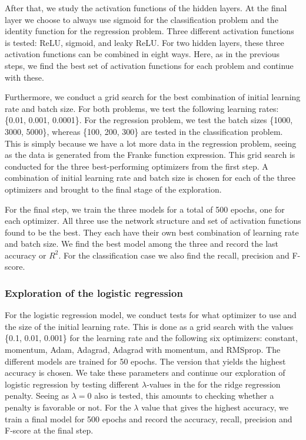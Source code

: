 After that, we study the activation functions of the hidden layers. At the final layer we choose to always use sigmoid for the classification problem and the identity function for the regression problem. 
Three different activation functions is tested: ReLU, sigmoid, and leaky ReLU. For two hidden layers, these three activation functions can be combined in eight ways. Here, as in the previous steps, we find the best set of activation functions for each problem and continue with these. 

Furthermore, we conduct a grid search for the best combination of initial learning rate and batch size. For both problems, we test the following learning rates: \{0.01, 0.001, 0.0001\}. 
For the regression problem, we test the batch sizes \{1000, 3000, 5000\}, whereas \{100, 200, 300\} are tested in the classification problem. 
This is simply because we have a lot more data in the regression problem, seeing as the data is generated from the Franke function expression. This grid search is conducted for the three best-performing optimizers from the first step. 
A combination of initial learning rate and batch size is chosen for each of the three optimizers and brought to the final stage of the exploration. 

For the final step, we train the three models for a total of 500 epochs, one for each optimizer. All three use the network structure and set of activation functions found to be the best. They each have their own best combination of learning rate and batch size. 
We find the best model among the three and record the last accuracy or $R^2$. For the classification case we also find the recall, precision and F-score. 

\subsubsection{Exploration of the logistic regression}

For the logistic regression model, we conduct tests for what optimizer to use and the size of the initial learning rate. 
This is done as a grid search with the values \{0.1, 0.01, 0.001\} for the learning rate and the following six optimizers: constant, momentum, Adam, Adagrad, Adagrad with momentum, and RMSprop. 
The different models are trained for 50 epochs. 
The version that yields the highest accuracy is chosen. 
We take these parameters and continue our exploration of logistic regression by testing different $\lambda$-values in the for the ridge regression penalty. Seeing as $\lambda = 0$ also is tested, this amounts to checking whether a penalty is favorable or not. 
For the $\lambda$ value that gives the highest accuracy, we train a final model for 500 epochs and record the accuracy, recall, precision and F-score at the final step. 